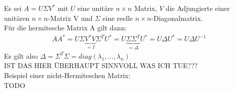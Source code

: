 Es sei $A=U\Sigma V^*$ mit $U$ eine unitäre $n\times n$ Matrix, $V$ die Adjungierte einer unitären $n\times n$-Matrix V und $\Sigma$ eine reelle $n\times n$-Diagonalmatrix.\\
Für die hermitesche Matrix A gilt dann:
\begin{align*}
AA^*=U\Sigma \underbrace{V^*V}_{=I}\Sigma^TU^*=U\underbrace{\Sigma\Sigma^T}_{=\Delta}U^*=U\Delta U^* = U\Delta U^{-1}
\end{align*}
Es gilt also $\Delta=\Sigma^T \Sigma=diag(\lambda_1,\ldots,\lambda_n)$\\
\newline
IST DAS HIER ÜBERHAUPT SINNVOLL WAS ICH TUE???\\
\newline
Beispiel einer nicht-Hermiteschen Matrix:\\
TODO\\